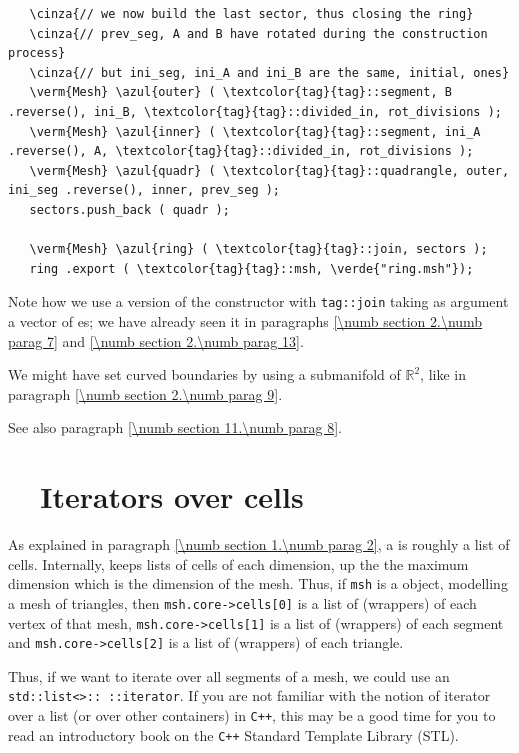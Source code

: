 \begin{Verbatim}
   \cinza{// we now build the last sector, thus closing the ring}
   \cinza{// prev_seg, A and B have rotated during the construction process}
   \cinza{// but ini_seg, ini_A and ini_B are the same, initial, ones}
   \verm{Mesh} \azul{outer} ( \textcolor{tag}{tag}::segment, B .reverse(), ini_B, \textcolor{tag}{tag}::divided_in, rot_divisions );
   \verm{Mesh} \azul{inner} ( \textcolor{tag}{tag}::segment, ini_A .reverse(), A, \textcolor{tag}{tag}::divided_in, rot_divisions );
   \verm{Mesh} \azul{quadr} ( \textcolor{tag}{tag}::quadrangle, outer, ini_seg .reverse(), inner, prev_seg );
   sectors.push_back ( quadr );
   
   \verm{Mesh} \azul{ring} ( \textcolor{tag}{tag}::join, sectors );
   ring .export ( \textcolor{tag}{tag}::msh, \verde{"ring.msh"});
\end{Verbatim}

Note how we use a version of the {\small\tt {}} constructor with {\small\tt \textcolor{tag}{tag}::join}
taking as argument a vector of {\small\tt {}}es; we have already seen it in paragraphs
\ref{\numb section 2.\numb parag 7} and \ref{\numb section 2.\numb parag 13}.

We might have set curved boundaries by using a submanifold of $ \mathbb{R}^2 $, like in paragraph
\ref{\numb section 2.\numb parag 9}.

See also paragraph \ref{\numb section 11.\numb parag 8}.


\section{~~Iterators over cells}\label{\numb section 9.\numb parag 3}

As explained in paragraph \ref{\numb section 1.\numb parag 2}, a {\small\tt {}} is
roughly a list of cells.
Internally, {\maniFEM} keeps lists of cells of each dimension, up the the maximum
dimension which is the dimension of the mesh.
Thus, if {\small\tt msh} is a {\small\tt {}} object, modelling a
mesh of triangles, then {\small\tt msh.core->cells[0]} is a list of (wrappers) of
each vertex of that mesh, {\small\tt msh.core->cells[1]} is a list of (wrappers) of
each segment and {\small\tt msh.core->cells[2]} is a list of (wrappers) of each triangle.

Thus, if we want to iterate over all segments of a mesh, we could use an
{\small\tt std::list<>:: ::iterator}.
If you are not familiar with the notion of iterator over a list (or over other containers)
in {\tt C++}, this may be a good time for you to read an introductory book on the
{\tt C++} Standard Template Library (STL).

